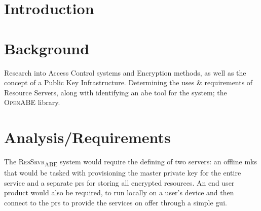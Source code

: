 \documentclass[british,table,svgnames,xcdraw]{l4proj}
\begin{document}
\newcommand{\thePolicyLang}{\textsc{PolLang}\textsubscript{ABE}\xspace}
\newcommand{\theResServer}{\textsc{ResSrvr}\textsubscript{ABE}\xspace}
\newcommand{\OpenABE}{\textsc{OpenABE}\xspace}
\newcommand{\PyOpenABE}{\textsc{PyOpenABE}\xspace}

\chapter{Introduction}
\label{ch:introduction}











\chapter{Background}
\label{ch:background}

Research into Access Control systems and Encryption methods, as well as the concept of a Public Key Infrastructure. Determining the uses \& requirements of Resource Servers, along with identifying an \acrshort{abe} tool for the system; the \OpenABE library.











\chapter{Analysis/Requirements}
\label{ch:analysis}

The \theResServer system would require the defining of two servers: an offline \acrfull{mks} that would be tasked with provisioning the master private key for the entire service and a separate \acrfull{prs} for storing all encrypted resources. An end user product would also be required, to run locally on a user's device and then connect to the \acrshort{prs} to provide the services on offer through a simple \acrshort{gui}\@.
\end{document}
